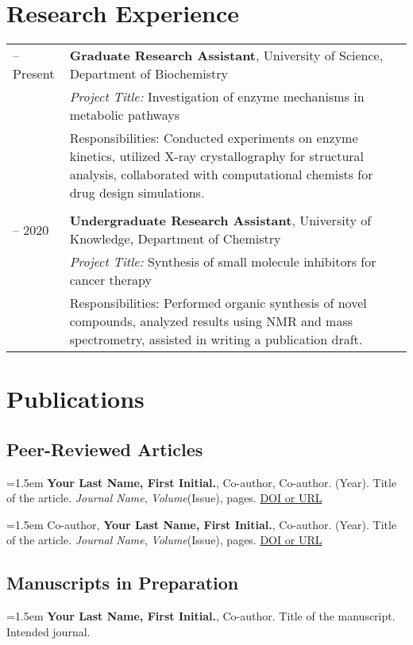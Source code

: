 \documentclass[a4paper,10pt]{article}
\begin{document}
\section{Research Experience}
\begin{tabularx}{\textwidth}{>{\raggedright\arraybackslash}p{2.5cm} X}
2020 -- Present & \textbf{Graduate Research Assistant}, University of Science, Department of Biochemistry \\
                & \textit{Project Title:} Investigation of enzyme mechanisms in metabolic pathways \\
                & Responsibilities: Conducted experiments on enzyme kinetics, utilized X-ray crystallography for structural analysis, collaborated with computational chemists for drug design simulations. \\
\\
2018 -- 2020    & \textbf{Undergraduate Research Assistant}, University of Knowledge, Department of Chemistry \\
                & \textit{Project Title:} Synthesis of small molecule inhibitors for cancer therapy \\
                & Responsibilities: Performed organic synthesis of novel compounds, analyzed results using NMR and mass spectrometry, assisted in writing a publication draft. \\
\end{tabularx}

\section{Publications}

\subsection{Peer-Reviewed Articles}
\hangindent=1.5em 
\textbf{Your Last Name, First Initial.}, Co-author, Co-author. (Year). Title of the article. \textit{Journal Name}, \textit{Volume}(Issue), pages. \href{DOI or URL}{DOI or URL}

\hangindent=1.5em 
\noindent Co-author, \textbf{Your Last Name, First Initial.}, Co-author. (Year). Title of the article. \textit{Journal Name}, \textit{Volume}(Issue), pages. \href{DOI or URL}{DOI or URL}

\subsection{Manuscripts in Preparation}
\hangindent=1.5em 
\textbf{Your Last Name, First Initial.}, Co-author. Title of the manuscript. Intended journal.
\end{document}
